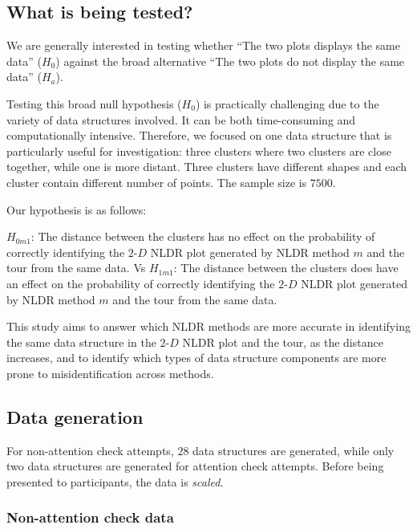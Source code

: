 \documentclass[
  11pt,
  a4paper,
]{report}
\newcommand\gD{$2\text{-}D$}
\begin{document}
\subsection{What is being tested?}\label{what-is-being-tested}

We are generally interested in testing whether ``The two plots displays
the same data'' (\(H_0\)) against the broad alternative ``The two plots
do not display the same data'' (\(H_a\)).

Testing this broad null hypothesis (\(H_0\)) is practically challenging
due to the variety of data structures involved. It can be both
time-consuming and computationally intensive. Therefore, we focused on
one data structure that is particularly useful for investigation: three
clusters where two clusters are close together, while one is more
distant. Three clusters have different shapes and each cluster contain
different number of points. The sample size is \(7500\).

Our hypothesis is as follows:

\(H_{0m1}\): The distance between the clusters has no effect on the
probability of correctly identifying the \gD{} NLDR plot generated by
NLDR method \(m\) and the tour from the same data. Vs \(H_{1m1}\): The
distance between the clusters does have an effect on the probability of
correctly identifying the \gD{} NLDR plot generated by NLDR method \(m\)
and the tour from the same data.

This study aims to answer which NLDR methods are more accurate in
identifying the same data structure in the \gD{} NLDR plot and the tour,
as the distance increases, and to identify which types of data structure
components are more prone to misidentification across methods.

\subsection{Data generation}\label{data-generation}

For non-attention check attempts, \(28\) data structures are generated,
while only two data structures are generated for attention check
attempts. Before being presented to participants, the data is
\emph{scaled}.

\subsubsection{Non-attention check data}\label{non-attention-check-data}
\end{document}

